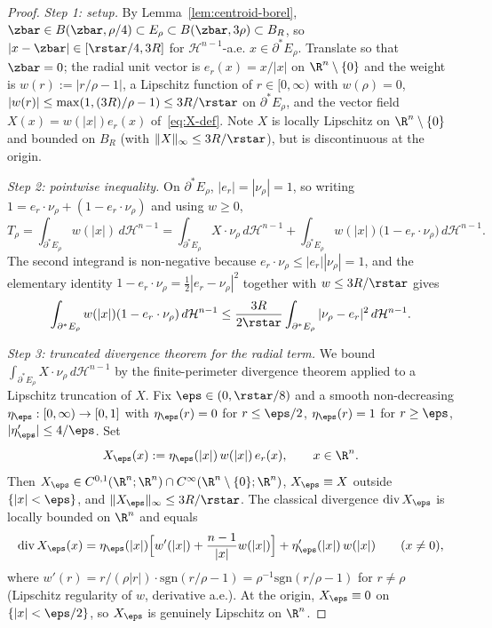 \begin{proof}
\emph{Step 1: setup.} By Lemma~\ref{lem:centroid-borel},
$\zbar\in B(\zbar,\rho/4)\subset E_\rho\subset B(\zbar,3\rho)\subset B_R$,
so $|x-\zbar|\in[\rstar/4,3R]$ for $\mathcal H^{n-1}$-a.e.
$x\in\partial^*E_\rho$. Translate so that $\zbar=0$; the radial unit
vector is $e_r(x)=x/|x|$ on $\R^n\setminus\{0\}$ and the
weight is $w(r):=|r/\rho-1|$, a Lipschitz function of $r\in[0,\infty)$
with $w(\rho)=0$, $|w(r)|\le \max(1,(3R)/\rho-1)\le 3R/\rstar$ on
$\partial^*E_\rho$, and the
vector field $X(x)=w(|x|)e_r(x)$ of~\eqref{eq:X-def}. Note $X$ is locally
Lipschitz on $\R^n\setminus\{0\}$ and bounded on $B_R$ (with
$\|X\|_\infty\le 3R/\rstar$), but is discontinuous at the origin.

\emph{Step 2: pointwise inequality.}
On $\partial^*E_\rho$, $|e_r|=|\nu_\rho|=1$, so writing
$1=e_r\cdot\nu_\rho+(1-e_r\cdot\nu_\rho)$ and using $w\ge0$,
\begin{equation}\label{eq:T-split}
   T_\rho
   =\int_{\partial^*E_\rho}w(|x|)\,d\mathcal H^{n-1}
   =\int_{\partial^*E_\rho}X\cdot\nu_\rho\,d\mathcal H^{n-1}
    +\int_{\partial^*E_\rho}w(|x|)\bigl(1-e_r\cdot\nu_\rho\bigr)\,d\mathcal H^{n-1}.
\end{equation}
The second integrand is non-negative because $e_r\cdot\nu_\rho\le|e_r||\nu_\rho|=1$,
and the elementary identity
$1-e_r\cdot\nu_\rho=\tfrac12|e_r-\nu_\rho|^2$ together with
$w\le3R/\rstar$ gives
\begin{equation}\label{eq:T-tan-bound}
   \int_{\partial^*E_\rho}w(|x|)(1-e_r\cdot\nu_\rho)\,d\mathcal H^{n-1}
   \le\frac{3R}{2\rstar}
   \int_{\partial^*E_\rho}|\nu_\rho-e_r|^2\,d\mathcal H^{n-1}.
\end{equation}

\emph{Step 3: truncated divergence theorem for the radial term.}
We bound $\int_{\partial^*E_\rho}X\cdot\nu_\rho\,d\mathcal H^{n-1}$ by the
finite-perimeter divergence theorem applied to a Lipschitz truncation of
$X$. Fix $\eps\in(0,\rstar/8)$ and a smooth non-decreasing
$\eta_\eps:[0,\infty)\to[0,1]$ with $\eta_\eps(r)=0$ for $r\le\eps/2$,
$\eta_\eps(r)=1$ for $r\ge\eps$, $|\eta_\eps'|\le4/\eps$. Set
\begin{equation}\label{eq:Xeps-def}
   X_\eps(x):=\eta_\eps(|x|)\,w(|x|)\,e_r(x),\qquad x\in\R^n.
\end{equation}
Then $X_\eps\in C^{0,1}(\R^n;\R^n)\cap C^\infty(\R^n\setminus\{0\};\R^n)$,
$X_\eps\equiv X$ outside $\{|x|<\eps\}$, and
$\|X_\eps\|_\infty\le 3R/\rstar$. The classical divergence
$\mathrm{div}\,X_\eps$ is locally bounded on $\R^n$ and equals
\begin{equation}\label{eq:divXeps}
   \mathrm{div}\,X_\eps(x)
   = \eta_\eps(|x|)\Bigl[w'(|x|)+\frac{n-1}{|x|}w(|x|)\Bigr]
     +\eta_\eps'(|x|)\,w(|x|)\qquad(x\ne0),
\end{equation}
where $w'(r)=r/(\rho|r|)\cdot\mathrm{sgn}(r/\rho-1)=\rho^{-1}\mathrm{sgn}(r/\rho-1)$
for $r\ne\rho$ (Lipschitz regularity of $w$, derivative a.e.).
At the origin, $X_\eps\equiv 0$ on $\{|x|<\eps/2\}$, so $X_\eps$ is genuinely
Lipschitz on $\R^n$.


\end{proof}
